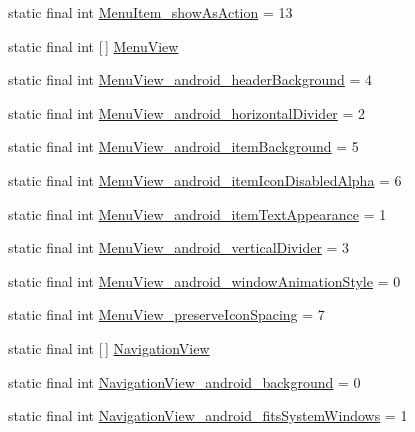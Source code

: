 \begin{DoxyCompactItemize}
static final int \hyperlink{classproject4_1_1xaria_1_1R_1_1styleable_a8388052a0c350c264867c69c217d9cb3}{Menu\+Item\+\_\+show\+As\+Action} = 13
\item 
static final int \mbox{[}$\,$\mbox{]} \hyperlink{classproject4_1_1xaria_1_1R_1_1styleable_ac1aef922f3c93d63048c893762b0dbda}{Menu\+View}
\item 
static final int \hyperlink{classproject4_1_1xaria_1_1R_1_1styleable_a1c95fec75ad396df1e8fe40acc009779}{Menu\+View\+\_\+android\+\_\+header\+Background} = 4
\item 
static final int \hyperlink{classproject4_1_1xaria_1_1R_1_1styleable_ac8dce77f204832af3ea731716ca38877}{Menu\+View\+\_\+android\+\_\+horizontal\+Divider} = 2
\item 
static final int \hyperlink{classproject4_1_1xaria_1_1R_1_1styleable_a2571658608ce1d5d8a959d3f06dc952d}{Menu\+View\+\_\+android\+\_\+item\+Background} = 5
\item 
static final int \hyperlink{classproject4_1_1xaria_1_1R_1_1styleable_a33cd80d140efb3245ac24e8c44d445d0}{Menu\+View\+\_\+android\+\_\+item\+Icon\+Disabled\+Alpha} = 6
\item 
static final int \hyperlink{classproject4_1_1xaria_1_1R_1_1styleable_a3d955c47903c9650c0f2722cc42904cb}{Menu\+View\+\_\+android\+\_\+item\+Text\+Appearance} = 1
\item 
static final int \hyperlink{classproject4_1_1xaria_1_1R_1_1styleable_ac550192a3b9eed5ec97313a89b3f93b9}{Menu\+View\+\_\+android\+\_\+vertical\+Divider} = 3
\item 
static final int \hyperlink{classproject4_1_1xaria_1_1R_1_1styleable_ab594d20426da891ee4202ce7515875cd}{Menu\+View\+\_\+android\+\_\+window\+Animation\+Style} = 0
\item 
static final int \hyperlink{classproject4_1_1xaria_1_1R_1_1styleable_a49472a6360fcdd0f2b8713f71f079e51}{Menu\+View\+\_\+preserve\+Icon\+Spacing} = 7
\item 
static final int \mbox{[}$\,$\mbox{]} \hyperlink{classproject4_1_1xaria_1_1R_1_1styleable_a93b7138d1a19f728c4d3933a75ce23e2}{Navigation\+View}
\item 
static final int \hyperlink{classproject4_1_1xaria_1_1R_1_1styleable_a08253d19475959882eff4afebd3d702e}{Navigation\+View\+\_\+android\+\_\+background} = 0
\item 
static final int \hyperlink{classproject4_1_1xaria_1_1R_1_1styleable_a3a323e4a98ccce401c1e052c95ff41d0}{Navigation\+View\+\_\+android\+\_\+fits\+System\+Windows} = 1
\item 

\end{DoxyCompactItemize}
